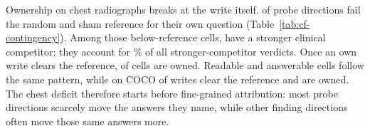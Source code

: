 \documentclass{article}
\begin{document}
Ownership on chest radiographs breaks at the write itself. \cfChestRefBelow{} of \cfChestCellsN{} probe directions fail the random and sham reference for their own question (Table~\ref{tab:cf-contingency}). Among those below-reference cells, \cfChestBelowStrong{} have a stronger clinical competitor; they account for \cfChestBelowStrongPct\% of all \cfChestCompetitor{} stronger-competitor verdicts. Once an own write clears the reference, \cfChestOwned{} of \cfChestRefMet{} cells are owned. Readable and answerable cells follow the same pattern, while on COCO \cfCocoRefMet{} of \cfCocoOwnedN{} writes clear the reference and \cfCocoOwned{} are owned. The chest deficit therefore starts before fine-grained attribution: most probe directions scarcely move the answers they name, while other finding directions often move those same answers more.
\end{document}
